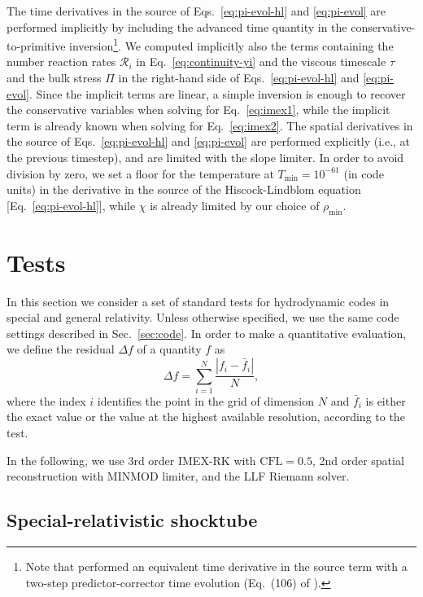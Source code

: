 \documentclass[aps,prd,twocolumn,a4paper,floatfix,nofootbib,superscriptaddress,nofootinbib]{revtex4}
\begin{document}
The time derivatives in the source of Eqs.~\eqref{eq:pi-evol-hl} and
\eqref{eq:pi-evol} are performed implicitly by including the advanced time
quantity in the conservative-to-primitive inversion\footnote{Note that
\citet{Chabanov_2021} performed an equivalent time derivative in the source
term with a two-step predictor-corrector time evolution (Eq.~(106) of
\citet{Chabanov_2021}).}.
We computed implicitly also the terms containing the number reaction rates $\mathcal R_i$ in
Eq.~\eqref{eq:continuity-yi} and the viscous timescale $\tau$ and the bulk
stress $\Pi$ in the right-hand side of Eqs.~\eqref{eq:pi-evol-hl} and
\eqref{eq:pi-evol}.
Since the implicit terms are linear, a simple
inversion is enough to recover the conservative variables when solving for
Eq.~\eqref{eq:imex1}, while the implicit term is already known when solving for
Eq.~\eqref{eq:imex2}.  The spatial derivatives in the source of
Eqs.~\eqref{eq:pi-evol-hl} and \eqref{eq:pi-evol} are performed explicitly
(i.e., at the previous timestep), and are limited with the slope limiter.  In
order to avoid division by zero, we set a floor for the temperature at
$T_\mathrm{min}=10^{-61}$ (in code units) in the derivative in the source of
the Hiscock-Lindblom equation [Eq.~\eqref{eq:pi-evol-hl}], while $\chi$ is
already limited by our choice of $\rho_\mathrm{min}$.

\section{Tests}
\label{sec:tests}

In this section we consider a set of standard tests for hydrodynamic codes in
special and general relativity. Unless otherwise specified, we use the same
code settings described in Sec.~\ref{sec:code}.
In order to make a quantitative evaluation, we define the residual $\Delta f$
of a quantity $f$ as
%
\begin{equation}
\label{eq:residual}
\Delta f=\sum_{i=1}^N\frac{\left|f_i - \bar f_i\right|}N,
\end{equation}
%
where the index $i$ identifies the point in the grid of dimension $N$ and $\bar
f_i$ is either the exact value or the value at the highest available
resolution, according to the test.

In the following, we use 3rd order IMEX-RK with $\mathrm{CFL}=0.5$,
2nd order spatial reconstruction with MINMOD limiter, and the LLF Riemann
solver.

\subsection{Special-relativistic shocktube}
\label{ssec:shocktube}
\end{document}
